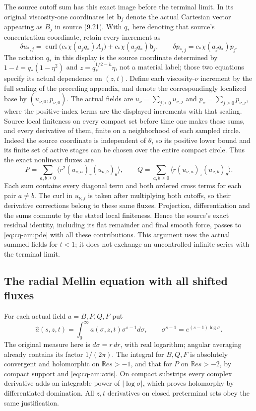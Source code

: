 The source cutoff sum has this exact image before the terminal limit.
In its original viscosity-one coordinates let
$\mathbf b_j$ denote the actual Cartesian vector appearing as $B_j$
in source (9.21). With $q_*$ here denoting that source's concentration
coordinate, retain every increment as
\[
 \delta u_{*,j}=\operatorname{curl}
          \bigl(c_*\chi(a_jq_*)A_j\bigr)
                  +c_*\chi(a_jq_*)\mathbf b_j,
 \qquad
 \delta p_{*,j}=c_*\chi(a_jq_*)p_j.
\]
The notation $q_*$ in this display is the source coordinate determined
by $1-t=q_*(1-\eta^2)$ and $z=q_*^{1/2-h}\eta$, not a material
label; those two equations specify its actual dependence on $(z,t)$.
Define each viscosity-$\nu$ increment by the full scaling of the
preceding appendix, and denote the correspondingly localized base by
$(u_{\nu,0},p_{\nu,0})$. The actual fields are
$u_\nu=\sum_{j\geq0}u_{\nu,j}$ and
$p_\nu=\sum_{j\geq0}p_{\nu,j}$, where the positive-index terms are
the displayed increments with that scaling. Source local finiteness
on every compact set before time one makes these sums, and every
derivative of them, finite on a neighborhood of each sampled circle.
Indeed the source coordinate is independent of $\theta$, so its
positive lower bound and its finite set of active stages can be
chosen over the entire compact circle. Thus the exact nonlinear fluxes
are
\[
 P=\sum_{a,b\geq0}\langle r^2(u_{\nu,a})_r(u_{\nu,b})_\theta\rangle,
 \qquad
 Q=\sum_{a,b\geq0}\langle r(u_{\nu,a})_z(u_{\nu,b})_\theta\rangle.
\]
Each sum contains every diagonal term and both ordered cross terms
for each pair $a\ne b$. The curl in $u_{\nu,j}$ is taken after
multiplying both cutoffs, so their derivative corrections belong to
these same fluxes. Projection, differentiation and the sums commute
by the stated local finiteness. Hence the source's exact residual
identity, including its flat remainder and final smooth force,
passes to \eqref{eq:cq-am:pde} with all these contributions. This argument
uses the actual summed fields for $t<1$; it does not exchange an
uncontrolled infinite series with the terminal limit.

\subsection{The radial Mellin equation with all shifted fluxes}

For each actual field $a=B,P,Q,F$ put
\[
 \widehat a(s,z,t)=\int_0^\infty a(\sigma,z,t)\sigma^{s-1}d\sigma,
 \qquad \sigma^{s-1}=e^{(s-1)\log\sigma}.
\]
The original measure here is $d\sigma=r\,dr$, with real logarithm;
angular averaging already contains its factor $1/(2\pi)$.
The integral for $B,Q,F$ is absolutely convergent and holomorphic on
$\mathbb Re s>-1$, and that for $P$ on $\mathbb Re s>-2$, by compact support
and \eqref{eq:cq-am:axis}. On compact substrips every complex derivative
adds an integrable power of $|\log\sigma|$, which proves
holomorphy by differentiated domination. All $z,t$ derivatives on
closed preterminal sets obey the same justification.

